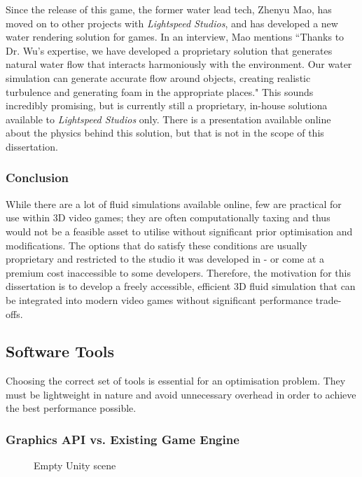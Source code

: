 \documentclass[12pt]{article}
\newcommand{\wideimage}[2][]{%
  \makebox[\textwidth][c]{\texttt{[image: \#2]}}%
}
\begin{document}
    Since the release of this game, the former water lead tech, Zhenyu Mao, has moved on to other projects with \textit{Lightspeed Studios}, and has developed a new water rendering solution for games. In an interview\cite{zhenyu}, Mao mentions ``Thanks to Dr. Wu's expertise, we have developed a proprietary solution that generates natural water flow that interacts harmoniously with the environment. Our water simulation can generate accurate flow around objects, creating realistic turbulence and generating foam in the appropriate places." This sounds incredibly promising, but is currently still a proprietary, in-house solutiona available to \textit{Lightspeed Studios} only. There is a presentation available online about the physics behind this solution\cite{zhenyupresent}, but that is not in the scope of this dissertation.

    \subsubsection{Conclusion}

    While there are a lot of fluid simulations available online, few are practical for use within 3D video games; they are often computationally taxing and thus would not be a feasible asset to utilise without significant prior optimisation and modifications. The options that do satisfy these conditions are usually proprietary and restricted to the studio it was developed in - or come at a premium cost inaccessible to some developers. Therefore, the motivation for this dissertation is to develop a freely accessible, efficient 3D fluid simulation that can be integrated into modern video games without significant performance trade-offs.

    \subsection{Software Tools}

    Choosing the correct set of tools is essential for an optimisation problem. They must be lightweight in nature and avoid unnecessary overhead in order to achieve the best performance possible.

    \subsubsection{Graphics API vs. Existing Game Engine}

    \begin{figure}[H]
        \noindent\wideimage[]{unityInterface.png}
        \caption{Empty Unity\cite{unity} scene}
    \end{figure}
\end{document}
